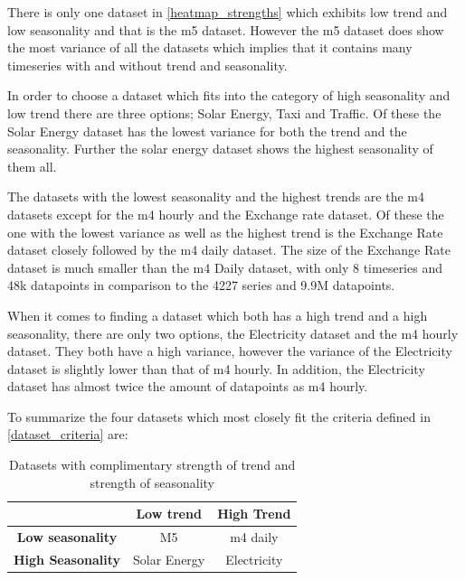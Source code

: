 There is only one dataset in \ref{heatmap_strengths} which exhibits low trend and low seasonality and that is the m5 dataset. However the m5 dataset does show the most variance of all the datasets which implies that it contains many timeseries with and without trend and seasonality. 

In order to choose a dataset which fits into the category of high seasonality and low trend there are three options; Solar Energy, Taxi and Traffic. Of these the Solar Energy dataset has the lowest variance for both the trend and the seasonality. Further the solar energy dataset shows the highest seasonality of them all. 

The datasets with the lowest seasonality and the highest trends are the m4 datasets except for the m4 hourly and the Exchange rate dataset. Of these the one with the lowest variance as well as the highest trend is the Exchange Rate dataset closely followed by the m4 daily dataset. The size of the Exchange Rate dataset is much smaller than the m4 Daily dataset, with only 8 timeseries and 48k datapoints in comparison to the 4227 series and 9.9M datapoints.

When it comes to finding a dataset which both has a high trend and a high seasonality, there are only two options, the Electricity dataset and the m4 hourly dataset. They both have a high variance, however the variance of the Electricity dataset is slightly lower than that of m4 hourly. In addition, the Electricity dataset has almost twice the amount of datapoints as m4 hourly.

To summarize the four datasets which most closely fit the criteria defined in \ref{dataset_criteria} are:

\begin{table}[htp]
    \centering
    \begin{tabular}{ccc} %
                                & {\bf Low trend }  & {\bf High Trend}\\
        \hline %
        {\bf Low seasonality}   & M5                & m4 daily\\
        \hline
        {\bf High Seasonality}  & Solar Energy      & Electricity\\
    \end{tabular}
    \caption{Datasets with complimentary strength of trend and strength of seasonality}
    \label{fig:representative_subset_of_datasets}
\end{table}

